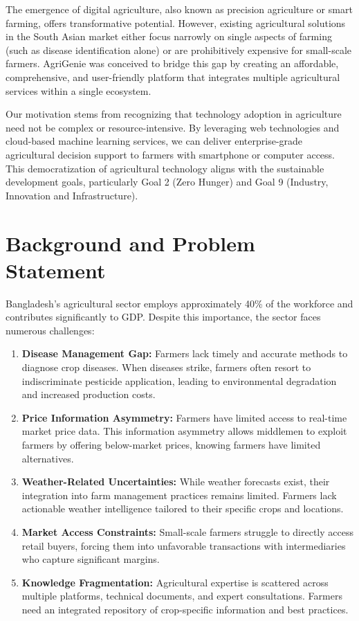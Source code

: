 \documentclass[12pt,a4paper]{report}
\begin{document}
The emergence of digital agriculture, also known as precision agriculture or smart farming, offers transformative potential. However, existing agricultural solutions in the South Asian market either focus narrowly on single aspects of farming (such as disease identification alone) or are prohibitively expensive for small-scale farmers. AgriGenie was conceived to bridge this gap by creating an affordable, comprehensive, and user-friendly platform that integrates multiple agricultural services within a single ecosystem.

Our motivation stems from recognizing that technology adoption in agriculture need not be complex or resource-intensive. By leveraging web technologies and cloud-based machine learning services, we can deliver enterprise-grade agricultural decision support to farmers with smartphone or computer access. This democratization of agricultural technology aligns with the sustainable development goals, particularly Goal 2 (Zero Hunger) and Goal 9 (Industry, Innovation and Infrastructure).

\section{Background and Problem Statement}

Bangladesh's agricultural sector employs approximately 40\% of the workforce and contributes significantly to GDP. Despite this importance, the sector faces numerous challenges:

\begin{enumerate}
    \item \textbf{Disease Management Gap:} Farmers lack timely and accurate methods to diagnose crop diseases. When diseases strike, farmers often resort to indiscriminate pesticide application, leading to environmental degradation and increased production costs.
    
    \item \textbf{Price Information Asymmetry:} Farmers have limited access to real-time market price data. This information asymmetry allows middlemen to exploit farmers by offering below-market prices, knowing farmers have limited alternatives.
    
    \item \textbf{Weather-Related Uncertainties:} While weather forecasts exist, their integration into farm management practices remains limited. Farmers lack actionable weather intelligence tailored to their specific crops and locations.
    
    \item \textbf{Market Access Constraints:} Small-scale farmers struggle to directly access retail buyers, forcing them into unfavorable transactions with intermediaries who capture significant margins.
    
    \item \textbf{Knowledge Fragmentation:} Agricultural expertise is scattered across multiple platforms, technical documents, and expert consultations. Farmers need an integrated repository of crop-specific information and best practices.
\end{enumerate}
\end{document}
